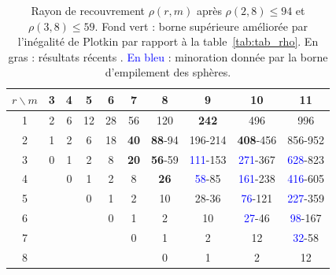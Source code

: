 \documentclass[11pt,a4paper]{article}
\def\SPB#1{\textcolor{blue}{#1}}
\theoremstyle{plain}
\theoremstyle{definition}
\theoremstyle{remark}
\begin{document}
\begin{table}[ht]
\centering
\caption{Rayon de recouvrement $\rho(r,m)$ après $\rho(2,8)\le 94$ et
$\rho(3,8)\le 59$. Fond vert : borne supérieure améliorée par l'inégalité de
Plotkin par rapport à la table~\ref{tab:tab_rho}. En gras : résultats récents
\cite{Wang19,GKLW,GL23,RM19,HSS26,KGP26}. \SPB{En bleu} : minoration donnée par la
borne d'empilement des sphères.}
\label{tab:tab_rho2}
\begin{tabular}{c|ccccccccc}
$r\backslash m$ & 3 & 4 & 5 & 6 & 7 & 8 & 9 & 10 & 11 \\
\hline
1 & 2 & 6 & 12 & 28 & 56 & 120 & \textbf{242} & 496 & 996 \\
2 & 1 & 2 & 6 & 18 & \textbf{40} & \cellcolor{ameliore}\textbf{88}-94 & \cellcolor{ameliore}196-214 & \cellcolor{ameliore}\textbf{408}-456 & \cellcolor{ameliore}856-952 \\
3 & 0 & 1 & 2 & 8 & \textbf{20} & \cellcolor{ameliore}\textbf{56}-59 & \cellcolor{ameliore}\SPB{111}-153 & \cellcolor{ameliore}\SPB{271}-367 & \cellcolor{ameliore}\SPB{628}-823 \\
4 &  & 0 & 1 & 2 & 8 & \textbf{26} & \cellcolor{ameliore}\SPB{58}-85 & \cellcolor{ameliore}\SPB{161}-238 & \cellcolor{ameliore}\SPB{416}-605 \\
5 &  &  & 0 & 1 & 2 & 10 & 28-36 & \cellcolor{ameliore}\SPB{76}-121 & \cellcolor{ameliore}\SPB{227}-359 \\
6 &  &  &  & 0 & 1 & 2 & 10 & \SPB{27}-46 & \cellcolor{ameliore}\SPB{98}-167 \\
7 &  &  &  &  & 0 & 1 & 2 & 12 & \SPB{32}-58 \\
8 &  &  &  &  &  & 0 & 1 & 2 & 12 \\
\hline
\end{tabular}
\end{table}
\end{document}

